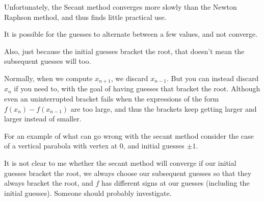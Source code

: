 Unfortunately, the Secant method converges more slowly than the Newton Raphson method, and thus finds little practical use.

It is possible for the guesses to alternate between a few values, and not converge.

Also, just because the initial guesses bracket the root, that doesn't mean the subsequent guesses will too.

Normally, when we compute $x_{n+1}$, we discard $x_{n-1}$. But you can instead discard $x_n$ if you need to, with the goal of having guesses that bracket the root. Although even an uninterrupted bracket fails when the expressions of the form $f(x_n) - f(x_{n-1})$ are too large, and thus the brackets keep getting larger and larger instead of smaller.

For an example of what can go wrong with the secant method consider the case of a vertical parabola with vertex at 0, and initial guesses $\pm 1$.

It is not clear to me whether the secant method will converge if our initial guesses bracket the root, we always choose our subsequent guesses so that they always bracket the root, and $f$ has different signs at our guesses (including the initial guesses). Someone should probably investigate.

